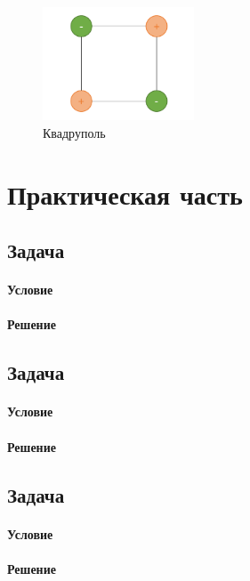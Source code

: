 \documentclass[12pt]{article}
\begin{document}
\begin{figure}[h]
    \centering
    \includegraphics[width=0.4\textwidth,height=\textheight,keepaspectratio]{Seminar_08/pics/pic_02.pdf}
    \caption{Квадруполь}
    \label{fig:sem_08_quad}
\end{figure}
\section{Практическая часть}
\subsection{Задача}
\label{task_}
\paragraph{Условие}
\paragraph{Решение}

\subsection{Задача}
\label{task_}
\paragraph{Условие}
\paragraph{Решение}

\subsection{Задача}
\label{task_}
\paragraph{Условие}
\paragraph{Решение}
\end{document}
